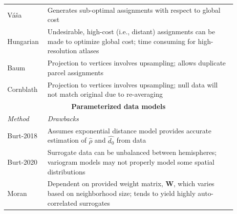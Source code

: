 \documentclass[12pt,aps,pra,reprint,showkeys]{revtex4-1}
\begin{document}
\begin{table}[htp]
\begin{center}
\begin{tabular}{p{0.15\linewidth} p{0.78\linewidth}}
        V{\'a}{\v{s}}a            & Generates sub-optimal assignments with respect to global cost                                                                                      \\
        Hungarian                 & Undesirable, high-cost (i.e., distant) assignments can be made to optimize global cost; time consuming for high-resolution atlases                 \\
        Baum                      & Projection to vertices involves upsampling; allows duplicate parcel assignments                                                                    \\
        Cornblath                 & Projection to vertices involves upsampling; null data will not match original due to re-averaging                                                  \\ \toprule
        \multicolumn{2}{c}{\textbf{Parameterized data models}}                                                                                                                         \\ \toprule
        \emph{Method}             & \emph{Drawbacks}                                                                                                                                   \\ \midrule
        Burt-2018                & Assumes exponential distance model provides accurate estimation of $\hat{\rho}$ and $\hat{d_{0}}$ from data                                        \\
        Burt-2020                & Surrogate data can be unbalanced between hemispheres; variogram models may not properly model some spatial distributions                           \\
        Moran                     & Dependent on provided weight matrix, $\mathbf{W}$, which varies based on neighborhood size; tends to yield highly auto-correlated surrogates       \\
      \end{tabular}
    \end{center}
\end{table}
\end{document}
